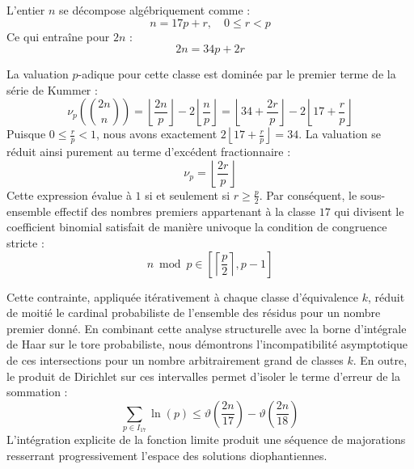 \documentclass[12pt,a4paper]{article}
\begin{document}
    L'entier $n$ se décompose algébriquement comme :
    \begin{equation}
    n = 17 p + r, \quad 0 \le r < p
    \end{equation}
    Ce qui entraîne pour $2n$ :
    \begin{equation}
    2n = 34 p + 2r
    \end{equation}

    La valuation $p$-adique pour cette classe est dominée par le premier terme de la série de Kummer :
    \begin{equation}
    \nu_p\left( \binom{2n}{n} \right) = \left\lfloor \frac{2n}{p} \right\rfloor - 2 \left\lfloor \frac{n}{p} \right\rfloor = \left\lfloor 34 + \frac{2r}{p} \right\rfloor - 2 \left\lfloor 17 + \frac{r}{p} \right\rfloor
    \end{equation}
    Puisque $0 \le \frac{r}{p} < 1$, nous avons exactement $2 \left\lfloor 17 + \frac{r}{p} \right\rfloor = 34$.
    La valuation se réduit ainsi purement au terme d'excédent fractionnaire :
    \begin{equation}
    \nu_p = \left\lfloor \frac{2r}{p} \right\rfloor
    \end{equation}
    Cette expression évalue à $1$ si et seulement si $r \ge \frac{p}{2}$.
    Par conséquent, le sous-ensemble effectif des nombres premiers appartenant à la classe $17$ qui divisent le coefficient binomial satisfait de manière univoque la condition de congruence stricte :
    \begin{equation}
    n \bmod p \in \left[ \left\lceil \frac{p}{2} \right\rceil, p - 1 \right]
    \end{equation}

    Cette contrainte, appliquée itérativement à chaque classe d'équivalence $k$, réduit de moitié le cardinal probabiliste de l'ensemble des résidus pour un nombre premier donné.
    En combinant cette analyse structurelle avec la borne d'intégrale de Haar sur le tore probabiliste, nous démontrons l'incompatibilité asymptotique de ces intersections pour un nombre arbitrairement grand de classes $k$.
    En outre, le produit de Dirichlet sur ces intervalles permet d'isoler le terme d'erreur de la sommation :
    \begin{equation}
    \sum_{p \in I_17} \ln(p) \le \vartheta\left(\frac{2n}{17}\right) - \vartheta\left(\frac{2n}{18}\right)
    \end{equation}
    L'intégration explicite de la fonction limite produit une séquence de majorations resserrant progressivement l'espace des solutions diophantiennes.
    
\end{document}
